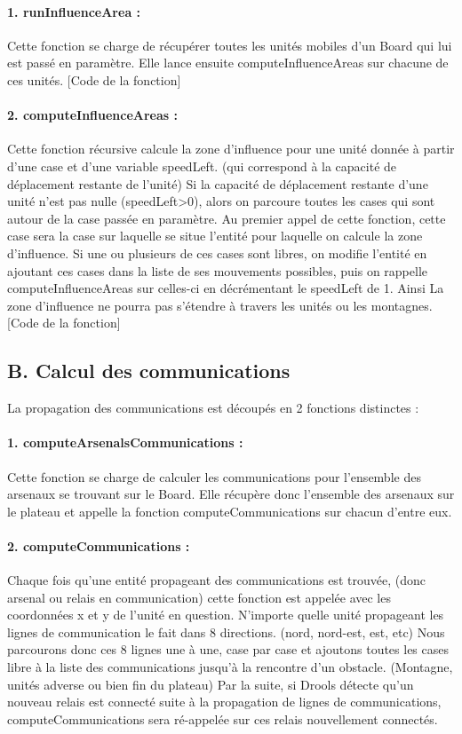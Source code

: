 \documentclass[12pt]{article}
\begin{document}
		\paragraph{1. runInfluenceArea : }
		Cette fonction se charge de récupérer toutes les unités mobiles d'un Board qui lui est passé en paramètre.
		Elle lance ensuite computeInfluenceAreas sur chacune de ces unités.
		[Code de la fonction]
		
		\paragraph{2. computeInfluenceAreas : }
		Cette fonction récursive calcule la zone d'influence pour une unité donnée à partir d'une case et d'une variable speedLeft. 
		(qui correspond à la capacité de déplacement restante de l'unité)
		Si la capacité de déplacement restante d'une unité n'est pas nulle (speedLeft>0), alors on parcoure toutes les cases 
		qui sont autour de la case passée en paramètre. 
		Au premier appel de cette fonction, cette case sera la case sur laquelle se situe l'entité pour laquelle on calcule la zone d'influence.
		Si une ou plusieurs de ces cases sont libres, on modifie l'entité en ajoutant ces cases dans la liste de ses mouvements possibles, 
		puis on rappelle computeInfluenceAreas sur celles-ci en décrémentant le speedLeft de 1.
		Ainsi La zone d'influence ne pourra pas s'étendre à travers les unités ou les montagnes.
		[Code de la fonction]
		
		\subsection{B. Calcul des communications}
		
		La propagation des communications est découpés en 2 fonctions distinctes :
		
		\paragraph{1. computeArsenalsCommunications : }
		Cette fonction se charge de calculer les communications pour l'ensemble des arsenaux se trouvant sur le Board.
		Elle récupère donc l'ensemble des arsenaux sur le plateau et appelle la fonction computeCommunications sur chacun d'entre eux.
		
		\paragraph{2. computeCommunications : }
		Chaque fois qu'une entité propageant des communications est trouvée, (donc arsenal ou relais en communication) cette fonction est appelée
		avec les coordonnées x et y de l'unité en question.
		N'importe quelle unité propageant les lignes de communication le fait dans 8 directions. (nord, nord-est, est, etc)
		Nous parcourons donc ces 8 lignes une à une, case par case et ajoutons toutes les cases libre à la liste des communications jusqu'à
		la rencontre d'un obstacle. (Montagne, unités adverse ou bien fin du plateau)
		Par la suite, si Drools détecte qu'un nouveau relais est connecté suite à la propagation de lignes de communications, computeCommunications
		sera ré-appelée sur ces relais nouvellement connectés.
		
\end{document}
